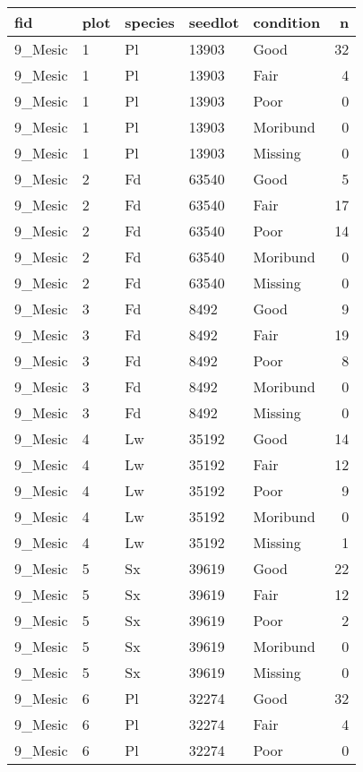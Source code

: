 \documentclass[
]{article}
\begin{document}
\begin{tabular}{l|l|l|l|l|r}
\hline
fid & plot & species & seedlot & condition & n\\
\hline
9\_Mesic & 1 & Pl & 13903 & Good & 32\\
\hline
9\_Mesic & 1 & Pl & 13903 & Fair & 4\\
\hline
9\_Mesic & 1 & Pl & 13903 & Poor & 0\\
\hline
9\_Mesic & 1 & Pl & 13903 & Moribund & 0\\
\hline
9\_Mesic & 1 & Pl & 13903 & Missing & 0\\
\hline
9\_Mesic & 2 & Fd & 63540 & Good & 5\\
\hline
9\_Mesic & 2 & Fd & 63540 & Fair & 17\\
\hline
9\_Mesic & 2 & Fd & 63540 & Poor & 14\\
\hline
9\_Mesic & 2 & Fd & 63540 & Moribund & 0\\
\hline
9\_Mesic & 2 & Fd & 63540 & Missing & 0\\
\hline
9\_Mesic & 3 & Fd & 8492 & Good & 9\\
\hline
9\_Mesic & 3 & Fd & 8492 & Fair & 19\\
\hline
9\_Mesic & 3 & Fd & 8492 & Poor & 8\\
\hline
9\_Mesic & 3 & Fd & 8492 & Moribund & 0\\
\hline
9\_Mesic & 3 & Fd & 8492 & Missing & 0\\
\hline
9\_Mesic & 4 & Lw & 35192 & Good & 14\\
\hline
9\_Mesic & 4 & Lw & 35192 & Fair & 12\\
\hline
9\_Mesic & 4 & Lw & 35192 & Poor & 9\\
\hline
9\_Mesic & 4 & Lw & 35192 & Moribund & 0\\
\hline
9\_Mesic & 4 & Lw & 35192 & Missing & 1\\
\hline
9\_Mesic & 5 & Sx & 39619 & Good & 22\\
\hline
9\_Mesic & 5 & Sx & 39619 & Fair & 12\\
\hline
9\_Mesic & 5 & Sx & 39619 & Poor & 2\\
\hline
9\_Mesic & 5 & Sx & 39619 & Moribund & 0\\
\hline
9\_Mesic & 5 & Sx & 39619 & Missing & 0\\
\hline
9\_Mesic & 6 & Pl & 32274 & Good & 32\\
\hline
9\_Mesic & 6 & Pl & 32274 & Fair & 4\\
\hline
9\_Mesic & 6 & Pl & 32274 & Poor & 0\\

\end{tabular}
\end{document}
